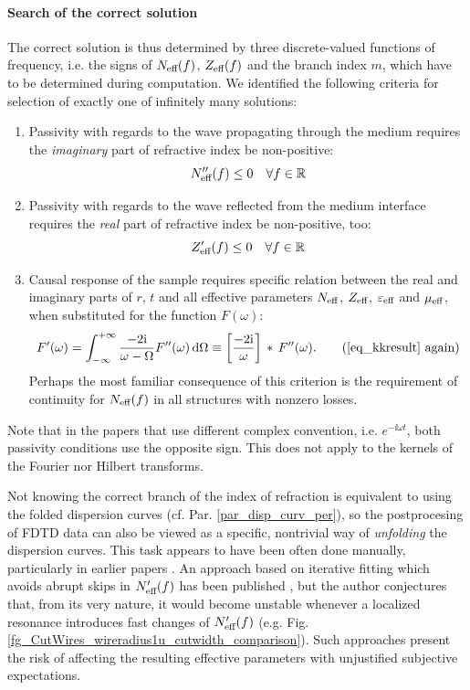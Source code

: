 \paragraph{Search of the correct solution} %
The correct solution is thus determined by three discrete-valued functions of frequency, i.e. the signs of $N_{\text{eff} }(f)$, $Z_{\text{eff} }(f)$ and the branch index $m$, which have to be determined during computation. 
We identified the following criteria for selection of exactly one of infinitely many solutions:
\begin{enumerate}
	\item{Passivity with regards to the wave propagating through the medium requires the \textit{imaginary} part of refractive index be non-positive: 
		 \begin{equation} N_{\text{eff} }''(f) \leq 0 \quad \forall f\in \mathbb{R} \label{eq_Neff_pass}\end{equation}
		 } 
	 \item{Passivity with regards to the wave reflected from the medium interface requires the \textit{real} part of refractive index be non-positive, too: 
		 \begin{equation} Z_{\text{eff} }'(f) \leq 0 \quad \forall f\in \mathbb{R} \label{eq_Zeff_pass}\end{equation}
		 } 
	 \item{Causal response of the sample requires specific relation between the real and imaginary parts of $r$, $t$ and all effective parameters $N_{\text{eff} }$, $Z_{\text{eff} }$, $\varepsilon_{\text{eff} }$ and $\mu_{\text{eff} }$, when substituted for the function $F(\omega)$:
		 \begin{equation} 
F'(\omega) = \int_{-\infty}^{+\infty}  \frac{-2\ii}{\omega - \Omega} F''(\omega) \,\mbox{d}\Omega  \equiv  \left[\frac{-2\ii}{\omega}\right]\,\ast\,F''(\omega). \tag{\ref{eq_kkresult} \again}\end{equation} 
Perhaps the most familiar consequence of this criterion is the requirement of continuity for $N_{\text{eff} }(f)$ in all structures with nonzero losses.
		 } 
\end{enumerate}
Note that in the papers that use different complex convention, i.e. $e^{-\ii\omega t}$, both passivity conditions use the opposite sign. This does not apply to the kernels of the Fourier nor Hilbert transforms.

Not knowing the correct branch of the index of refraction is equivalent to using the folded dispersion curves (cf. Par. \ref{par_disp_curv_per}), %
so the postprocesing of FDTD data can also be viewed as a specific, nontrivial way of \textit{unfolding} the dispersion curves. This task appears to have been often done manually, particularly in earlier papers \cite{smith2002determination}. An approach based on iterative fitting which avoids abrupt skips in $N_{\text{eff} }'(f)$ has been published \cite{chen2004robust}, but the author conjectures that, from its very nature, it would become unstable whenever a localized resonance introduces fast changes of $N_{\text{eff} }'(f)$ (e.g. Fig. \ref{fg_CutWires_wireradius1u_cutwidth_comparison}). Such approaches present the risk of affecting the resulting effective parameters with unjustified subjective expectations.

